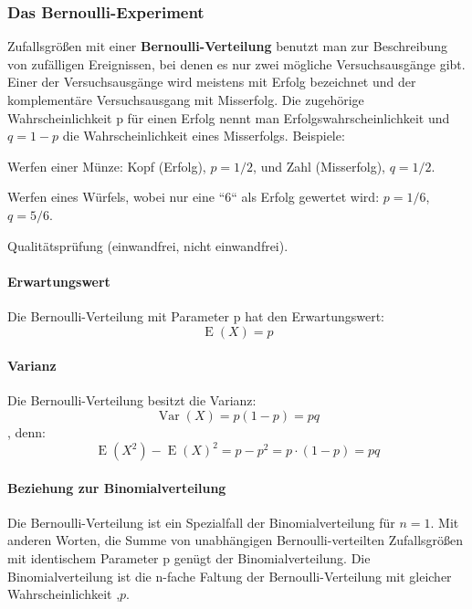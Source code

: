 \documentclass[a4paper,10pt,DIV9, BCOR12mm, oneside,openright,openbib]{scrreprt}
\theoremstyle{definition}
\theoremstyle{plain}
\begin{document}
\subsubsection{Das Bernoulli-Experiment}
Zufallsgrößen mit einer \textbf{Bernoulli-Verteilung} benutzt man zur Beschreibung von zufälligen Ereignissen, bei denen es nur zwei mögliche Versuchsausgänge gibt. Einer der Versuchsausgänge wird meistens mit Erfolg bezeichnet und der komplementäre Versuchsausgang mit Misserfolg. Die zugehörige Wahrscheinlichkeit p für einen Erfolg nennt man Erfolgswahrscheinlichkeit und $ q=1-p $ die Wahrscheinlichkeit eines Misserfolgs. Beispiele:
\begin{list}{}{}
\item Werfen einer Münze: Kopf (Erfolg), $ p=1/2 $, und Zahl (Misserfolg), $ q=1/2 $. \\
\item Werfen eines Würfels, wobei nur eine “6“ als Erfolg gewertet wird: $ p=1/6 $, $ q=5/6 $.\\
\item Qualitätsprüfung (einwandfrei, nicht einwandfrei).\\
\end{list}
\paragraph{Erwartungswert}
Die Bernoulli-Verteilung mit Parameter p hat den Erwartungswert:
\[\operatorname{E}\left(X\right)=p\]
\paragraph{Varianz}
Die Bernoulli-Verteilung besitzt die Varianz:
\[\operatorname{Var}(X) = p(1-p)= pq \], denn: \[ \operatorname{E}\left(X^2\right)-\operatorname{E}(X)^2=p-p^2 = p\cdot(1-p) = pq\]
\paragraph{Beziehung zur Binomialverteilung}
Die Bernoulli-Verteilung ist ein Spezialfall der Binomialverteilung für $ n=1 $. Mit anderen Worten, die Summe von unabhängigen Bernoulli-verteilten Zufallsgrößen mit identischem Parameter p genügt der Binomialverteilung. Die Binomialverteilung ist die n-fache Faltung der Bernoulli-Verteilung mit gleicher Wahrscheinlichkeit ,$ p $.
\end{document}
